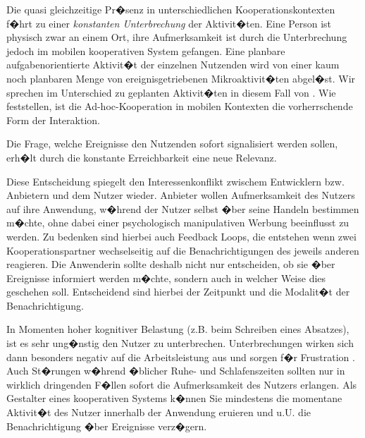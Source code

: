Die quasi gleichzeitige Pr�senz in unterschiedlichen Kooperationskontexten f�hrt zu einer \emph{konstanten Unterbrechung} der Aktivit�ten. Eine Person ist physisch zwar an einem Ort, ihre Aufmerksamkeit ist durch die Unterbrechung jedoch im mobilen kooperativen System gefangen. Eine planbare aufgabenorientierte Aktivit�t der einzelnen Nutzenden wird von einer kaum noch planbaren Menge von ereignisgetriebenen Mikroaktivit�ten abgel�st. Wir sprechen im Unterschied zu geplanten Aktivit�ten in diesem Fall von . Wie \citet{Hakkila2005} feststellen, ist die Ad-hoc-Kooperation in mobilen Kontexten die vorherrschende Form der Interaktion. 

Die Frage, welche Ereignisse den Nutzenden sofort signalisiert werden sollen, erh�lt durch die konstante Erreichbarkeit eine neue Relevanz. 


Diese Entscheidung spiegelt den Interessenkonflikt zwischem Entwicklern bzw. Anbietern und dem Nutzer wieder. Anbieter wollen Aufmerksamkeit des Nutzers auf ihre Anwendung, w�hrend der Nutzer selbst �ber seine Handeln bestimmen m�chte, ohne dabei einer psychologisch manipulativen Werbung beeinflusst zu werden. Zu bedenken sind hierbei auch Feedback Loops, die entstehen wenn zwei Kooperationspartner wechselseitig auf die Benachrichtigungen des jeweils anderen reagieren. Die Anwenderin sollte deshalb nicht nur entscheiden, ob sie �ber Ereignisse informiert werden m�chte, sondern auch in welcher Weise dies geschehen soll. Entscheidend sind hierbei der Zeitpunkt und die Modalit�t der Benachrichtigung. 

In Momenten hoher kognitiver Belastung (z.B. beim Schreiben eines Absatzes), ist es sehr ung�nstig den Nutzer zu unterbrechen. Unterbrechungen wirken sich dann besonders negativ auf die Arbeitsleistung aus und sorgen f�r Frustration \cite{Czerwinski2016}. Auch St�rungen w�hrend �blicher Ruhe- und Schlafenszeiten sollten nur in wirklich dringenden F�llen sofort die Aufmerksamkeit des Nutzers erlangen. Als Gestalter eines kooperativen Systems k�nnen Sie mindestens die momentane Aktivit�t des Nutzer innerhalb der Anwendung eruieren und u.U. die Benachrichtigung �ber Ereignisse verz�gern. 
\label{attention} 

